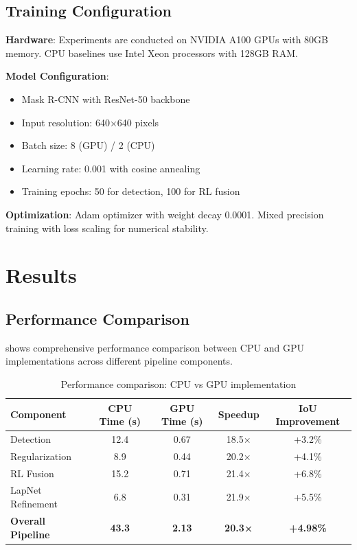 \documentclass{article}
\begin{document}
\subsection{Training Configuration}

\textbf{Hardware}: Experiments are conducted on NVIDIA A100 GPUs with 80GB memory. CPU baselines use Intel Xeon processors with 128GB RAM.

\textbf{Model Configuration}: 
\begin{itemize}
\item Mask R-CNN with ResNet-50 backbone
\item Input resolution: 640×640 pixels
\item Batch size: 8 (GPU) / 2 (CPU)  
\item Learning rate: 0.001 with cosine annealing
\item Training epochs: 50 for detection, 100 for RL fusion
\end{itemize}

\textbf{Optimization}: Adam optimizer with weight decay 0.0001. Mixed precision training with loss scaling for numerical stability.

\section{Results}

\subsection{Performance Comparison}

 shows comprehensive performance comparison between CPU and GPU implementations across different pipeline components.

\begin{table}[tb]
\centering
\caption{Performance comparison: CPU vs GPU implementation}
\label{tab:performance}
\begin{tabular}{lcccc}
\toprule
Component & CPU Time (s) & GPU Time (s) & Speedup & IoU Improvement \\
\midrule
Detection & 12.4 & 0.67 & 18.5× & +3.2\% \\
Regularization & 8.9 & 0.44 & 20.2× & +4.1\% \\  
RL Fusion & 15.2 & 0.71 & 21.4× & +6.8\% \\
LapNet Refinement & 6.8 & 0.31 & 21.9× & +5.5\% \\
\midrule
\textbf{Overall Pipeline} & \textbf{43.3} & \textbf{2.13} & \textbf{20.3×} & \textbf{+4.98\%} \\
\bottomrule
\end{tabular}
\end{table}
\end{document}
